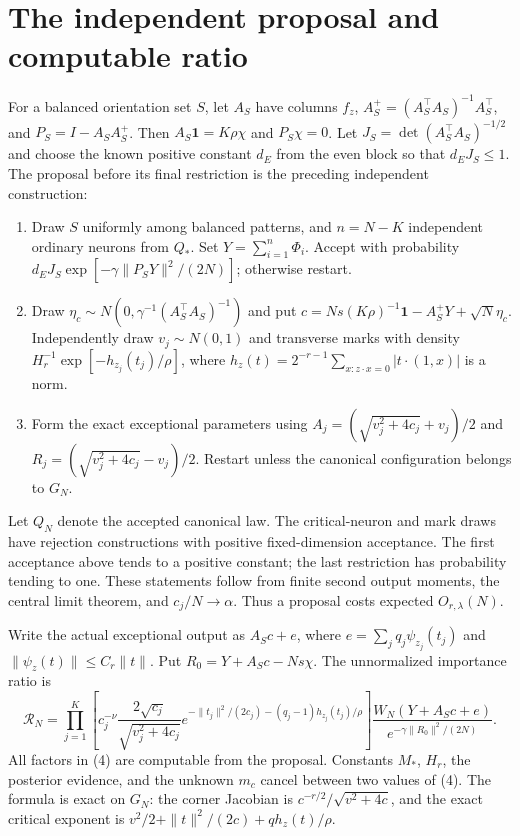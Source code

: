 \documentclass[11pt]{article}
\begin{document}
\section{The independent proposal and computable ratio}
For a balanced orientation set $S$, let $A_S$ have columns $f_z$,
$A_S^+=(A_S^\top A_S)^{-1}A_S^\top$, and $P_S=I-A_SA_S^+$.
Then $A_S\mathbf1=K\rho\chi$ and $P_S\chi=0$.
Let $J_S=\det(A_S^\top A_S)^{-1/2}$ and choose the known positive
constant $d_E$ from the even block so that $d_EJ_S\le1$.
The proposal before its final restriction is the preceding independent
construction:
\begin{enumerate}
\item Draw $S$ uniformly among balanced patterns, and $n=N-K$ independent
ordinary neurons from $Q_*$. Set $Y=\sum_{i=1}^n\Phi_i$.
Accept with probability $d_EJ_S\exp[-\gamma\|P_SY\|^2/(2N)]$;
otherwise restart.
\item Draw $\eta_c\sim N(0,\gamma^{-1}(A_S^\top A_S)^{-1})$ and put
$c=Ns(K\rho)^{-1}\mathbf1-A_S^+Y+\sqrt N\eta_c$.
Independently draw $v_j\sim N(0,1)$ and transverse marks with density
$H_r^{-1}\exp[-h_{z_j}(t_j)/\rho]$, where
$h_z(t)=2^{-r-1}\sum_{x:z\cdot x=0}|t\cdot(1,x)|$ is a norm.
\item Form the exact exceptional parameters using
$A_j=(\sqrt{v_j^2+4c_j}+v_j)/2$ and
$R_j=(\sqrt{v_j^2+4c_j}-v_j)/2$. Restart unless the canonical
configuration belongs to $G_N$.
\end{enumerate}
Let $Q_N$ denote the accepted canonical law. The critical-neuron and
mark draws have rejection constructions with positive fixed-dimension
acceptance. The first acceptance above tends to a positive constant;
the last restriction has probability tending to one. These statements
follow from finite second output moments, the central limit theorem,
and $c_j/N\to\alpha$. Thus a proposal costs expected $O_{r,\lambda}(N)$.

Write the actual exceptional output as $A_Sc+e$, where
$e=\sum_jq_j\psi_{z_j}(t_j)$ and
$\|\psi_z(t)\|\le C_r\|t\|$. Put
$R_0=Y+A_Sc-Ns\chi$. The unnormalized importance ratio is
\[
 \mathcal R_N=
 \prod_{j=1}^K\left[
 c_j^{-\nu}\frac{2\sqrt{c_j}}{\sqrt{v_j^2+4c_j}}
 e^{-\|t_j\|^2/(2c_j)-(q_j-1)h_{z_j}(t_j)/\rho}\right]
 \frac{W_N(Y+A_Sc+e)}{e^{-\gamma\|R_0\|^2/(2N)}}.       \tag{4}
\]
All factors in (4) are computable from the proposal. Constants $M_*$,
$H_r$, the posterior evidence, and the unknown $m_c$ cancel between
two values of (4). The formula is exact on $G_N$: the corner Jacobian
is $c^{-r/2}/\sqrt{v^2+4c}$, and the exact critical exponent is
$v^2/2+\|t\|^2/(2c)+qh_z(t)/\rho$.
\end{document}
